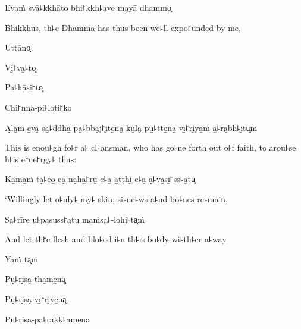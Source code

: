 
\begin{leader}
\end{leader}

E̱va̱ṁ svā̱꜕kkhā̱to̱ bhi̱꜓kkh꜕a̮ve̱ ma̮yā̱ dha̱mmo͓

\begin{english}
  Bhikkhus, th꜕e Dhamma has thus been we꜕ll expo꜓unded by me,
\end{english}

U̱ttā̱no͓


Vi̮꜓va̮꜕ṭo͓


Pa̮꜕kā̱si̮꜓to͓


Chi꜓nna-pi꜕loti꜓ko


A̮la̮m-e̱va̮ sa̱꜕ddhā̱-pa̱꜕bba̮j꜓i̮te̱na̮ ku̮la̮-pu̱꜕tte̱na̮ vī̱꜓ri̮ya̱ṁ ā̱꜕ra̮bh꜕i̮tu͓ṁ

\begin{english}
  This is enou꜕gh fo꜕r a꜕ cl꜕ansman, who has go꜕ne forth out o꜕f faith,
  to arou꜕se h꜕is e꜓ne꜓rgy꜕ thus:
\end{english}

Kā̱ma̱ṁ ta̮꜕co̱ ca̮ na̮hā̱꜓ru̮ c꜕a̮ a̱ṭṭhi̮ c꜕a̮ a̮꜕va̮si̱꜓ss꜕a̮tu͓

\begin{english}
  `Willingly let o꜕nly꜕ my꜕ skin, si꜕ne꜕ws a꜕nd bo꜕nes re꜕main,
\end{english}

Sa̮꜕rī̱re̱ u̮꜕pa̮su̱ss꜓a̮tu̮ ma̱ṁsa̮꜕-lo̱hi̮꜕ta͓ṁ

\begin{english}
  And let th꜓e flesh and blo꜕od i꜕n th꜕is bo꜕dy wi꜕th꜕er a꜕way.
\end{english}

Ya̱ṁ ta͓ṁ


Pu̮꜕ri̮sa̮-thā̱me̱na͓


Pu̮꜕ri̮sa̮-vī̱꜓ri̮ye̱na͓


Pu꜕risa-pa꜕rakk꜕amena


